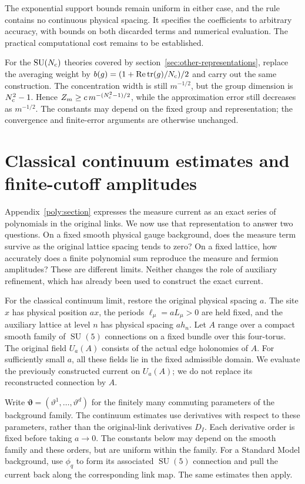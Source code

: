 \documentclass[11pt,a4paper]{article}
\theoremstyle{remark}
\DeclareMathOperator{\tr}{tr}
\DeclareMathOperator{\SU}{SU}
\begin{document}
The exponential support bounds remain uniform in either case, and the
rule contains no continuous physical spacing. It specifies the
coefficients to arbitrary accuracy, with bounds on both discarded terms
and numerical evaluation. The practical computational cost remains to
be established.

For the $\SU(N_{\rm c})$ theories covered by
section~\ref{sec:other-representations}, replace the averaging weight
by $b(g)=(1+\operatorname{Re}\tr(g)/N_{\rm c})/2$ and carry out
the same construction. The concentration width is still $m^{-1/2}$,
but the group dimension is $N_{\rm c}^2-1$. Hence
$Z_m\ge c\,m^{-(N_{\rm c}^2-1)/2}$, while the approximation error
still decreases as $m^{-1/2}$. The constants may depend on the fixed
group and representation; the convergence and finite-error arguments
are otherwise unchanged.

\section{Classical continuum estimates and finite-cutoff amplitudes}
\label{phys:section}

Appendix~\ref{poly:section} expresses the measure current as an exact
series of polynomials in the original links. We now use that representation
to answer two questions. On a fixed smooth physical gauge background,
does the measure term survive as the original lattice spacing tends to
zero? On a fixed lattice, how accurately does a finite polynomial sum
reproduce the measure and fermion amplitudes? These are different limits.
Neither changes the role of auxiliary refinement, which has already
been used to construct the exact current.

For the classical continuum limit, restore the original physical spacing
$a$. The site $x$ has physical position $ax$, the periods
$\ell_\mu=aL_\mu>0$ are held fixed, and the auxiliary lattice at level
$n$ has physical spacing $ah_n$. Let $A$ range over a compact smooth
family of $\SU(5)$ connections on a fixed bundle over this four-torus.
The original field $U_a(A)$ consists of the actual edge holonomies of
$A$. For sufficiently small $a$, all these fields lie in the fixed
admissible domain. We evaluate the previously constructed current on
$U_a(A)$; we do not replace its reconstructed connection by $A$.

Write $\boldsymbol\vartheta=(\vartheta^1,\ldots,\vartheta^d)$ for the
finitely many commuting parameters of the background family. The
continuum estimates use derivatives with respect to these parameters,
rather than the original-link derivatives $D_I$. Each derivative order is fixed before taking $a\to0$. The
constants below may depend on the smooth family and these orders, but
are uniform within the family. For a Standard Model background, use
$\phi_q$ to form its associated $\SU(5)$ connection and pull the current
back along the corresponding link map. The same estimates then apply.
\end{document}
